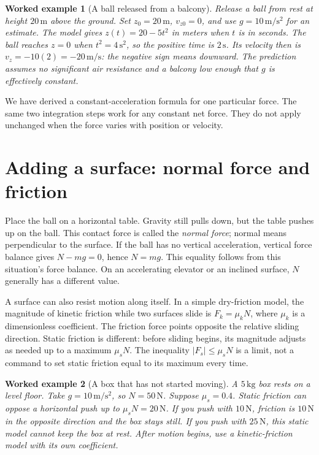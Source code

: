 \documentclass[11pt,oneside]{book}
\theoremstyle{reviewstyle}
\newtheorem{example}{Worked example}[chapter]
\begin{document}
\begin{example}[A ball released from a balcony]
Release a ball from rest at height $20\,\mathrm m$ above the ground. Set $z_0=20\,\mathrm m$, $v_{z0}=0$, and use $g=10\,\mathrm{m/s^2}$ for an estimate. The model gives $z(t)=20-5t^2$ in meters when $t$ is in seconds. The ball reaches $z=0$ when $t^2=4\,\mathrm{s^2}$, so the positive time is $2\,\mathrm s$. Its velocity then is $v_z=-10(2)=-20\,\mathrm{m/s}$: the negative sign means downward. The prediction assumes no significant air resistance and a balcony low enough that $g$ is effectively constant.
\end{example}

We have derived a constant-acceleration formula for one particular force. The same two integration steps work for any constant net force. They do not apply unchanged when the force varies with position or velocity.

\section{Adding a surface: normal force and friction}
Place the ball on a horizontal table. Gravity still pulls down, but the table pushes up on the ball. This contact force is called the \emph{normal force}; normal means perpendicular to the surface. If the ball has no vertical acceleration, vertical force balance gives $N-mg=0$, hence $N=mg$. This equality follows from this situation's force balance. On an accelerating elevator or an inclined surface, $N$ generally has a different value.

A surface can also resist motion along itself. In a simple dry-friction model, the magnitude of kinetic friction while two surfaces slide is $F_k=\mu_kN$, where $\mu_k$ is a dimensionless coefficient. The friction force points opposite the relative sliding direction. Static friction is different: before sliding begins, its magnitude adjusts as needed up to a maximum $\mu_sN$. The inequality $|F_s|\leq\mu_sN$ is a limit, not a command to set static friction equal to its maximum every time.

\begin{example}[A box that has not started moving]
A $5\,\mathrm{kg}$ box rests on a level floor. Take $g=10\,\mathrm{m/s^2}$, so $N=50\,\mathrm N$. Suppose $\mu_s=0.4$. Static friction can oppose a horizontal push up to $\mu_sN=20\,\mathrm N$. If you push with $10\,\mathrm N$, friction is $10\,\mathrm N$ in the opposite direction and the box stays still. If you push with $25\,\mathrm N$, this static model cannot keep the box at rest. After motion begins, use a kinetic-friction model with its own coefficient.
\end{example}
\end{document}
